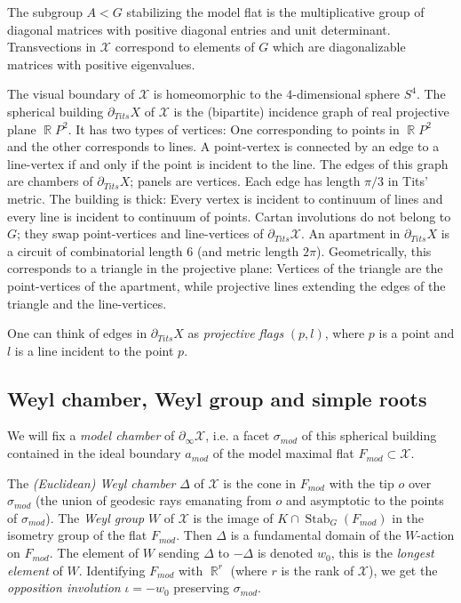 \documentclass[12pt]{amsbook}%
\theoremstyle{definition}
\theoremstyle{remark}
\numberwithin{section}{chapter}
\numberwithin{subsection}{section}
\numberwithin{figure}{chapter}
\DeclareMathOperator{\Stab}{Stab}
\DeclareMathOperator{\R}{\mathbb{R}}
\def\tits{\partial_{Tits}}
\def\simod{\sigma_{mod}}
\def\Fmod{F_{mod}}
\def\amod{a_{mod}}
\def\cX{{\mathscr{X}}}
\def\geo{\partial_\infty}
\begin{document}
{{The subgroup $A< G$ stabilizing the model flat is the multiplicative 
group of diagonal matrices with positive diagonal entries and unit determinant. 
Transvections in $\cX$ correspond to elements of $G$ which are diagonalizable matrices with positive eigenvalues. 


The visual boundary of $\cX$ is homeomorphic to the $4$-dimensional sphere $S^4$. The spherical building $\tits X$ of $\cX$ is the (bipartite) incidence graph of real projective plane $\R P^2$. It has two types of vertices: One corresponding to points in $\R P^2$ and the other corresponds to lines. A point-vertex is connected by an edge to a line-vertex if and only if the point is incident to the line. The edges of this graph are chambers of   $\tits X$; panels are vertices. Each edge has length $\pi/3$ in Tits' metric. The building is thick: Every vertex is incident to continuum of lines and every line is incident to continuum of points. Cartan involutions do not belong to $G$; they swap point-vertices and line-vertices of $\tits \cX$.  An apartment in  $\tits X$ is a circuit of combinatorial length $6$ (and metric length $2\pi$). Geometrically, this corresponds to a triangle in the projective plane: Vertices of the triangle are the point-vertices of the apartment, while projective lines extending the edges of the triangle and the line-vertices. 


One can think of edges in $\tits X$ as {\em projective flags} $(p,l)$, where $p$ is a point and $l$ is a line incident to the point $p$.
  
  

  
  
\subsection{Weyl chamber, Weyl group and simple roots}  
  
 We will fix a {\em model chamber} of $\geo \cX$, i.e. a  facet $\simod$ 
 of this spherical  building contained in the ideal boundary $\amod$ \index{$\amod$, model apartment}
 of the  model maximal flat $\Fmod\subset \cX$. \index{$\simod$, model chamber}
  
  
  The {\em (Euclidean) Weyl chamber} $\Delta$ of $\cX$ is the cone in $\Fmod$ with the tip $o$ over   
 $\simod$ (the union of geodesic rays emanating from $o$ and asymptotic to the points of $\simod$). The {\em Weyl group} $W$ of $\cX$ 
 is the image of $K\cap \Stab_G(\Fmod)$ in the isometry group of the flat $\Fmod$. Then $\Delta$ is a fundamental domain of the $W$-action on $\Fmod$. 
 The element of $W$ sending $\Delta$ to $-\Delta$ is denoted $w_0$, this is the {\em longest element} of $W$.  
  Identifying $\Fmod$ with $\R^r$ (where $r$ is the rank of $\cX$), we get the {\em opposition involution} $\iota=-w_0$ preserving $\simod$.  
  
}}
\end{document}
